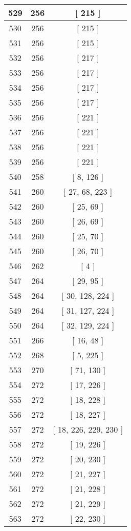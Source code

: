 \begin{center}
\begin{longtable}[H]{|| c c c ||}
\hline
529 & 256 & [ 215 ] \\ 
\hline
530 & 256 & [ 215 ] \\ 
\hline
531 & 256 & [ 215 ] \\ 
\hline
532 & 256 & [ 217 ] \\ 
\hline
533 & 256 & [ 217 ] \\ 
\hline
534 & 256 & [ 217 ] \\ 
\hline
535 & 256 & [ 217 ] \\ 
\hline
536 & 256 & [ 221 ] \\ 
\hline
537 & 256 & [ 221 ] \\ 
\hline
538 & 256 & [ 221 ] \\ 
\hline
539 & 256 & [ 221 ] \\ 
\hline
540 & 258 & [ 8, 126 ] \\ 
\hline
541 & 260 & [ 27, 68, 223 ] \\ 
\hline
542 & 260 & [ 25, 69 ] \\ 
\hline
543 & 260 & [ 26, 69 ] \\ 
\hline
544 & 260 & [ 25, 70 ] \\ 
\hline
545 & 260 & [ 26, 70 ] \\ 
\hline
546 & 262 & [ 4 ] \\ 
\hline
547 & 264 & [ 29, 95 ] \\ 
\hline
548 & 264 & [ 30, 128, 224 ] \\ 
\hline
549 & 264 & [ 31, 127, 224 ] \\ 
\hline
550 & 264 & [ 32, 129, 224 ] \\ 
\hline
551 & 266 & [ 16, 48 ] \\ 
\hline
552 & 268 & [ 5, 225 ] \\ 
\hline
553 & 270 & [ 71, 130 ] \\ 
\hline
554 & 272 & [ 17, 226 ] \\ 
\hline
555 & 272 & [ 18, 228 ] \\ 
\hline
556 & 272 & [ 18, 227 ] \\ 
\hline
557 & 272 & [ 18, 226, 229, 230 ] \\ 
\hline
558 & 272 & [ 19, 226 ] \\ 
\hline
559 & 272 & [ 20, 230 ] \\ 
\hline
560 & 272 & [ 21, 227 ] \\ 
\hline
561 & 272 & [ 21, 228 ] \\ 
\hline
562 & 272 & [ 21, 229 ] \\ 
\hline
563 & 272 & [ 22, 230 ] \\ 
\hline

\end{longtable}
\end{center}
